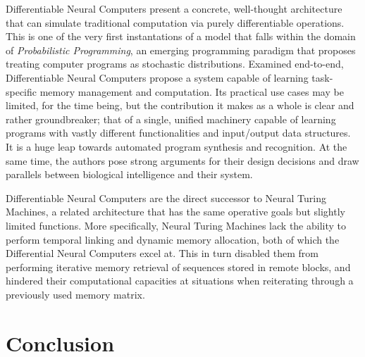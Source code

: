 \documentclass[]{article}
\begin{document}
Differentiable Neural Computers present a concrete, well-thought architecture that can simulate traditional computation via purely differentiable operations. This is one of the very first instantations of a model that falls within the domain of \textit{Probabilistic Programming}\cite{Meijer}, an emerging programming paradigm that proposes treating computer programs as stochastic distributions. Examined end-to-end, Differentiable Neural Computers propose a system capable of learning task-specific memory management and computation. Its practical use cases may be limited, for the time being, but the contribution it makes as a whole is clear and rather groundbreaker; that of a single, unified machinery capable of learning programs with vastly different functionalities and input/output data structures. It is a huge leap towards automated program synthesis and recognition. At the same time, the authors pose strong arguments for their design decisions and draw parallels between biological intelligence and their system. 

Differentiable Neural Computers are the direct successor to Neural Turing Machines\cite{DBLP:journals/corr/GravesWD14}, a related architecture that has the same operative goals but slightly limited functions. More specifically, Neural Turing Machines lack the ability to perform temporal linking and dynamic memory allocation, both of which the Differential Neural Computers excel at. This in turn disabled them from performing iterative memory retrieval of sequences stored in remote blocks, and hindered their computational capacities at situations when reiterating through a previously used memory matrix. 




\section{Conclusion}
\label{Conc}



\end{document}
